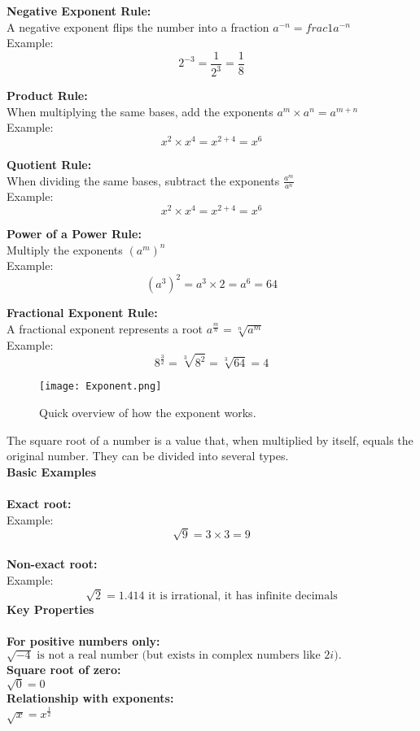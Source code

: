 \documentclass{article} %
\begin{document}
\noindent\textbf{Negative Exponent Rule:}\\
A negative exponent flips the number into a fraction $a^{-n} = frac{1}{a^{-n}}$\\
Example:\\
\[
2^{-3} = \frac{1}{2^{3}} = \frac{1}{8} 
\]

\noindent\textbf{Product Rule:}\\
When multiplying the same bases, add the exponents $a^{m} \times a^{n} = a^{m + n}$\\
Example:\\
\[
x^{2} \times x^{4} = x^{2 + 4} = x^{6}
\]

\noindent\textbf{Quotient Rule:}\\
When dividing the same bases, subtract the exponents $\frac{a^{m}}{a^{n}}$\\
Example:\\
\[
x^{2} \times x^{4} = x^{2 + 4} = x^{6}
\]

\noindent\textbf{Power of a Power Rule:}\\
Multiply the exponents $(a^{m})^{n}$\\
Example:\\
\[
(a^{3})^{2} = a^3\times 2 = a^{6} = 64
\]

\noindent\textbf{Fractional Exponent Rule:}\\
A fractional exponent represents a root $a^{\frac{m}{n}} = \sqrt[n]{a^{m}}$\\
Example:\\
\[
8^{\frac{3}{2}} = \sqrt[3]{8^{2}} = \sqrt[3]{64} = 4
\]


\begin{figure}[H]
    \centering
    \texttt{[image: Exponent.png]}
    \caption{Quick overview of how the exponent works.}
    \label{fig:etiqueta}
\end{figure}

The square root of a number is a value that, when multiplied by itself, equals the original number. They can be divided into several types.
\\
\textbf{Basic Examples}\\
\\
\textbf{Exact root:}\\
Example:\\
\[
\sqrt{9} = 3 \times 3 = 9
\]
\\
\textbf{Non-exact root:}\\
Example:\\
\[
\sqrt{2} = 1.414 \text{ it is irrational, it has infinite decimals}
\]
\textbf{Key Properties}\\
\\
\textbf{For positive numbers only:}\\
$\sqrt{-4} \text{ is not a real number (but exists in complex numbers like \(2i\)).}$
\\
\textbf{Square root of zero:}\\
$\sqrt{0} = 0$
\\
\textbf{Relationship with exponents:}\\
$\sqrt{x} = x^{\frac{1}{2}}$
\end{document}
